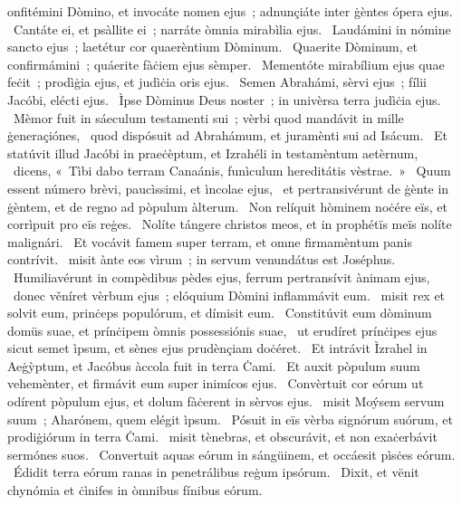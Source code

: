 \psalmChapterWithInscription{}
{ }
{%
onfitémini Dòmino, et invocáte nomen ejus~; adnunçiáte inter ġèntes ópera ejus. 
~Cantáte ei, et psàllite ei~; narráte òmnia mirabìlia ejus. 
~Laudámini in nómine sancto ejus~; laetétur cor quaerèntium Dòminum. 
~Quaerite Dòminum, et confirmámini~; quáerite fàċiem ejus sèmper. 
~Mementóte mirabílium ejus quae feċit~; prodìġia ejus, et judìċia oris ejus. 
~Semen Abrahámi, sèrvi ejus~; fílii Jacóbi, elécti ejus. 
~Ìpse Dòminus Deus noster~; in univèrsa terra judìċia ejus. 
~Mèmor fuit in sáeculum testamenti sui~; vèrbi quod mandávit in mille ġeneraçiónes, 
~quod dispósuit ad Abrahámum, et juramènti sui ad Isácum. 
~Et statúvit illud Jacóbi in praeċèptum, et Izrahéli in testamèntum aetèrnum, 
~dicens, «~Tìbi dabo terram Canaánis, funìculum hereditátis vèstrae.~» 
~Quum essent número brèvi, paucìssimi, et ìncolae ejus, 
~et pertransivérunt de ġènte in ġèntem, et de regno ad pòpulum àlterum. 
~Non relíquit hòminem noċére eïs, et corrìpuit pro eïs reġes. 
~Nolíte tángere christos meos, et in prophétïs meïs nolíte malignári. 
~Et vocávit famem super terram, et omne firmamèntum panis contrívit. 
~misit ànte eos vìrum~; in servum venundátus est Joséphus. 
~Humiliavérunt in compèdibus pèdes ejus, ferrum pertransívit ànimam ejus, 
~donec věníret vèrbum ejus~; elóquium Dòmini inflammávit eum. 
~misit rex et solvit eum, prinċeps populórum, et dímisit eum. 
~Constitúvit eum dòminum domüs suae, et prínċipem òmnis possessiónis suae, 
~ut erudíret prínċipes ejus sicut semet ìpsum, et sènes ejus prudènçiam doċéret. 
~Et intrávit Ìzrahel in Aeġỳptum, et Jacóbus àccola fuit in terra Ċami. 
~Et auxit pòpulum suum vehemènter, et firmávit eum super inimícos ejus. 
~Convèrtuit cor eórum ut odírent pòpulum ejus, et dolum fàċerent in sèrvos ejus. 
~misit Moýsem servum suum~; Aharónem, quem elégit ìpsum. 
~Pósuit in eïs vèrba signórum suórum, et prodiġiórum in terra Ċami. 
~misit tènebras, et obscurávit, et non exaċerbávit sermónes suos. 
~Convertuit aquas eórum in sángüinem, et occáesit pìsċes eórum. 
~Édidit terra eórum ranas in penetrálibus reġum ipsórum. 
~Dixit, et vënit chynómia et ċìnifes in òmnibus fínibus eórum. 
}
